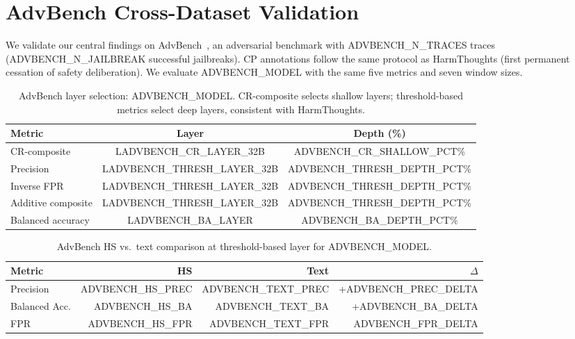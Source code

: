 
\section{AdvBench Cross-Dataset Validation}\label{app:advbench}

We validate our central findings on AdvBench~\citep{advbench}, an adversarial benchmark with {{ADVBENCH_N_TRACES}} traces ({{ADVBENCH_N_JAILBREAK}} successful jailbreaks). CP annotations follow the same protocol as HarmThoughts (first permanent cessation of safety deliberation). We evaluate {{ADVBENCH_MODEL}} with the same five metrics and seven window sizes.

\begin{table}[h]
\centering
\small
\caption{AdvBench layer selection: {{ADVBENCH_MODEL}}. CR-composite selects shallow layers; threshold-based metrics select deep layers, consistent with HarmThoughts.}
\label{tab:advbench_layer_selection}
\begin{tabular}{lcc}
\toprule
\textbf{Metric} & \textbf{Layer} & \textbf{Depth (\%)} \\
\midrule
CR-composite & L{{ADVBENCH_CR_LAYER_32B}} & {{ADVBENCH_CR_SHALLOW_PCT}}\% \\
Precision & L{{ADVBENCH_THRESH_LAYER_32B}} & {{ADVBENCH_THRESH_DEPTH_PCT}}\% \\
Inverse FPR & L{{ADVBENCH_THRESH_LAYER_32B}} & {{ADVBENCH_THRESH_DEPTH_PCT}}\% \\
Additive composite & L{{ADVBENCH_THRESH_LAYER_32B}} & {{ADVBENCH_THRESH_DEPTH_PCT}}\% \\
Balanced accuracy & L{{ADVBENCH_BA_LAYER}} & {{ADVBENCH_BA_DEPTH_PCT}}\% \\
\bottomrule
\end{tabular}
\end{table}

\begin{table}[h]
\centering
\small
\caption{AdvBench HS vs.\ text comparison at threshold-based layer for {{ADVBENCH_MODEL}}.}
\label{tab:advbench_hs_text}
\begin{tabular}{lrrr}
\toprule
\textbf{Metric} & \textbf{HS} & \textbf{Text} & $\Delta$ \\
\midrule
Precision & {{ADVBENCH_HS_PREC}} & {{ADVBENCH_TEXT_PREC}} & +{{ADVBENCH_PREC_DELTA}} \\
Balanced Acc. & {{ADVBENCH_HS_BA}} & {{ADVBENCH_TEXT_BA}} & +{{ADVBENCH_BA_DELTA}} \\
FPR & {{ADVBENCH_HS_FPR}} & {{ADVBENCH_TEXT_FPR}} & {{ADVBENCH_FPR_DELTA}} \\
\bottomrule
\end{tabular}
\end{table}

